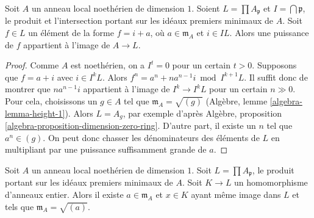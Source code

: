 \begin{lemma}
\label{lemma-power-works}
Soit $A$ un anneau local noethérien de dimension $1$.
Soient $L = \prod A_\mathfrak p$ et $I = \bigcap \mathfrak p$,
le produit et l'intersection portant sur
les idéaux premiers minimaux de $A$. Soit $f \in L$ un élément
de la forme $f = i + a$, où $a \in \mathfrak m_A$ et
$i \in IL$. Alors une puissance de $f$ appartient à l'image de $A \to L$.
\end{lemma}

\begin{proof}
Comme $A$ est noethérien, on a $I^t = 0$ pour un certain $t > 0$.
Supposons que $f = a + i$ avec $i \in I^kL$.
Alors $f^n = a^n + na^{n - 1}i \bmod I^{k + 1}L$.
Il suffit donc de montrer que $na^{n - 1}i$ appartient à
l'image de $I^k \to I^kL$ pour un certain $n \gg 0$.
Pour cela, choisissons un $g \in A$ tel que $\mathfrak m_A = \sqrt{(g)}$
(Algèbre, lemme \ref{algebra-lemma-height-1}). Alors $L = A_g$, par exemple d'après
Algèbre, proposition \ref{algebra-proposition-dimension-zero-ring}.
D'autre part, il existe un $n$ tel que $a^n \in (g)$.
On peut donc chasser les dénominateurs des éléments de $L$
en multipliant par une puissance suffisamment grande de $a$.
\end{proof}

\begin{lemma}
\label{lemma-good-intersection}
Soit $A$ un anneau local noethérien de dimension $1$.
Soit $L = \prod A_\mathfrak p$, le produit portant sur
les idéaux premiers minimaux de $A$. Soit $K \to L$ un homomorphisme d'anneaux entier.
Alors il existe $a \in \mathfrak m_A$ et $x \in K$
ayant même image dans $L$ et tels que $\mathfrak m_A = \sqrt{(a)}$.
\end{lemma}

